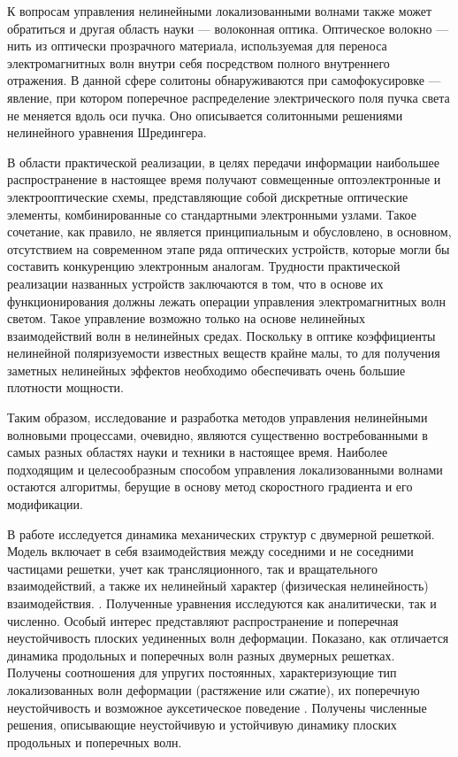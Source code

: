 К вопросам управления нелинейными локализованными волнами также может обратиться и другая область науки --- волоконная оптика. Оптическое волокно --- нить из оптически прозрачного материала, используемая для переноса электромагнитных волн внутри себя посредством полного внутреннего отражения. В данной сфере солитоны обнаруживаются при самофокусировке --- явление, при котором поперечное распределение электрического поля пучка света не меняется вдоль оси пучка. Оно описывается солитонными решениями нелинейного уравнения Шредингера. 

В области практической реализации, в целях передачи информации наибольшее распространение в настоящее время получают совмещенные оптоэлектронные и электрооптические схемы, представляющие собой дискретные оптические элементы, комбинированные со стандартными электронными узлами. Такое сочетание, как правило, не является принципиальным и обусловлено, в основном, отсутствием на современном этапе ряда оптических устройств, которые могли бы составить конкуренцию электронным аналогам. Трудности практической реализации названных устройств заключаются в том, что в основе их функционирования должны лежать операции управления электромагнитных волн светом. Такое управление возможно только на основе нелинейных взаимодействий волн в нелинейных средах. Поскольку в оптике коэффициенты нелинейной поляризуемости известных веществ крайне малы, то для получения заметных нелинейных эффектов необходимо обеспечивать очень большие плотности мощности.

Таким образом, исследование и разработка методов управления нелинейными волновыми процессами, очевидно, являются существенно востребованными в самых разных областях науки и техники в настоящее время. Наиболее подходящим и целесообразным способом управления локализованными волнами остаются алгоритмы, берущие в основу метод скоростного градиента и его модификации. 



В работе исследуется динамика механических структур с двумерной решеткой. Модель включает в себя взаимодействия между соседними и не соседними частицами решетки, учет как трансляционного, так и вращательного взаимодействий, а также их нелинейный характер (физическая нелинейность) взаимодействия. . Полученные уравнения исследуются как аналитически, так и численно. Особый интерес представляют распространение и поперечная неустойчивость плоских уединенных волн деформации. Показано, как отличается динамика продольных и поперечных волн разных двумерных решетках. Получены соотношения для упругих постоянных, характеризующие тип локализованных волн деформации (растяжение или сжатие), их поперечную неустойчивость и возможное ауксетическое поведение . Получены численные решения, описывающие неустойчивую и устойчивую динамику плоских продольных и поперечных волн.

